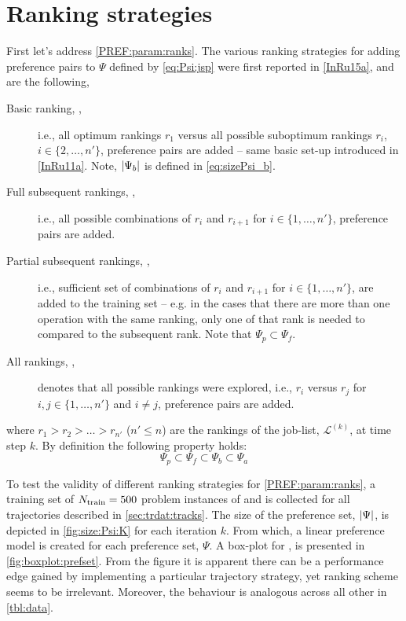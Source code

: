 \section{Ranking strategies}\label{sec:trdat:param:ranks}
First let's address \ref{PREF:param:ranks}. 
The various ranking strategies for adding preference pairs to $\Psi$ defined by 
\cref{eq:Psi:jsp} were first reported in \cref{InRu15a}, and are the following,
\begin{description}
    \item[Basic ranking, ,] i.e., all optimum rankings $r_1$ versus 
    all 
    possible suboptimum rankings $r_i$, $i\in\{2,\ldots,n'\}$, preference pairs 
    are added -- same basic set-up introduced in \cref{InRu11a}. Note, 
    $\lvert\Psi_b\rvert$ is defined in \cref{eq:sizePsi_b}.
    \item[Full subsequent rankings, ,] i.e., all possible 
    combinations 
    of $r_i$ and $r_{i+1}$ for $i\in\{1,\ldots,n'\}$, preference pairs are 
    added.
    \item[Partial subsequent rankings, ,] i.e., sufficient set of 
    combinations of $r_i$ and $r_{i+1}$ for $i\in\{1,\ldots,n'\}$, are added to 
    the training set -- e.g. in the cases that there are more than one 
    operation with the same ranking, only one of that rank is needed to 
    compared to the subsequent rank. Note that $\Psi_p\subset \Psi_f$.
    \item[All rankings, ,] denotes that all possible rankings were 
    explored, i.e.,
    $r_i$ versus $r_j$ for $i,j\in\{1,\ldots,n'\}$ and $i\neq j$, preference 
    pairs are added.
\end{description}
where $r_1>r_2>\ldots>r_{n'}$ ($n'\leq n$) are the rankings of the job-list, 
$\mathcal{L}^{(k)}$, at time step $k$.
By definition the following property holds:
\begin{equation}\label{eq:Psi:size}
    \Psi_p \subset \Psi_f \subset \Psi_b \subset \Psi_a
\end{equation}

To test the validity of different ranking strategies for 
\ref{PREF:param:ranks}, 
a training set of $N_{\text{train}}=500$ problem instances of  and 
is collected for all trajectories described in 
\cref{sec:trdat:tracks}. 
The size of the preference set, $\lvert\Psi\rvert$, is depicted in 
\cref{fig:size:Psi:K} for each iteration $k$. 
From which, a linear preference model is created for each preference 
set, $\Psi$. A box-plot for \fullnamerho, is presented in 
\cref{fig:boxplot:prefset}. 
From the figure it is apparent there can be a performance edge gained by 
implementing a particular trajectory strategy, yet ranking scheme seems to be 
irrelevant. Moreover, the behaviour is analogous across all other 
\Problem[6\times5]{\train} in \cref{tbl:data}.

